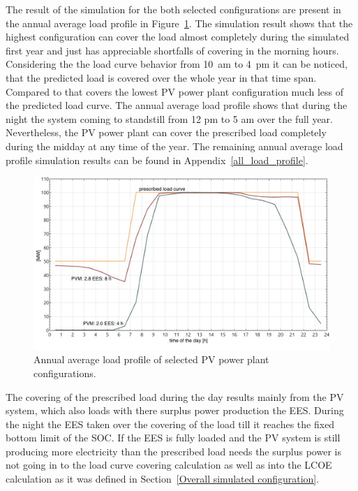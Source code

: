 The result of the simulation for the both selected configurations are present in the annual average load profile in Figure~\ref{PV_annual_profil}. The simulation result shows that the highest configuration can cover the load almost completely during the simulated first year and just has appreciable shortfalls of covering in the morning hours. Considering the the load curve behavior from 10~am to 4~pm it can be noticed, that the predicted load is covered over the whole year in that time span. Compared to that covers the lowest PV power plant configuration much less of the predicted load curve. The  annual average load profile shows that during the night the system coming to standstill from 12 pm to 5 am over the full year. Nevertheless, the PV power plant can cover the prescribed load completely during the midday at any time of the year. The remaining  annual average load profile simulation results can be found in Appendix~\ref{all_load_profile}.

\begin{figure}[htbp]  
\centering
\includegraphics[width=0.8\linewidth]{FIG/PV_annual_profil}
\caption[Annual average load profile of selected PV power plant configurations.]{Annual average load profile of selected PV power plant configurations.}\label{PV_annual_profil}
\end{figure}
The covering of the prescribed load during the day results mainly from the PV system, which also loads with there surplus power production the EES. During the night the EES taken over the covering of the load till it reaches the fixed bottom limit of the SOC. If the EES is fully loaded and the PV system is still producing more electricity than the prescribed load needs the surplus power is not going in to the load curve covering calculation as well as into the LCOE calculation as it was defined in Section~\ref{Overall simulated configuration}. 

